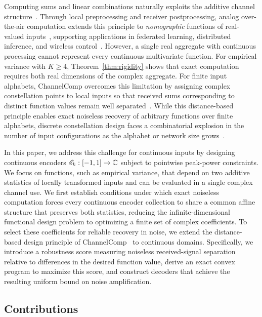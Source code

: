 \documentclass[journal,12pt,onecolumn,draftclsnofoot]{IEEEtran}
\begin{document}
Computing sums and linear combinations naturally exploits the additive channel structure~\cite{nazer2007}. Through local preprocessing and receiver postprocessing, analog over-the-air computation extends this principle to \emph{nomographic} functions of real-valued inputs~\cite{golden2013harnessing}, supporting applications in federated learning, distributed inference, and wireless control~\cite{amiri2020federated,yilmaz2025private,park2021optimized}. However, a single real aggregate with continuous processing cannot represent every continuous multivariate function. For empirical variance with $K\ge4$, Theorem~\ref{thm:rigidity} shows that exact computation requires both real dimensions of the complex aggregate. For finite input alphabets, ChannelComp overcomes this limitation by assigning complex constellation points to local inputs so that received sums corresponding to distinct function values remain well separated~\cite{channelcomp2024}. While this distance-based principle enables exact noiseless recovery of arbitrary functions over finite alphabets, discrete constellation design faces a combinatorial explosion in the number of input configurations as the alphabet or network size grows~\cite{sumcomp2025,pyramidsampling2025}.



In this paper, we address this challenge for continuous inputs by designing continuous encoders $\mathscr E_k:[-1,1]\to\mathbb C$ subject to pointwise peak-power constraints. We focus on functions, such as empirical variance, that depend on two additive statistics of locally transformed inputs and can be evaluated in a single complex channel use. We first establish conditions under which exact noiseless computation forces every continuous encoder collection to share a common affine structure that preserves both statistics, reducing the infinite-dimensional functional design problem to optimizing a finite set of complex coefficients. To select these coefficients for reliable recovery in noise, we extend the distance-based design principle of ChannelComp~\cite{channelcomp2024} to continuous domains. Specifically, we introduce a robustness score measuring noiseless received-signal separation relative to differences in the desired function value, derive an exact convex program to maximize this score, and construct decoders that achieve the resulting uniform bound on noise amplification.

\subsection{Contributions}
\end{document}
